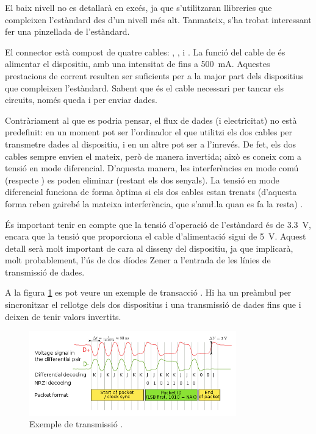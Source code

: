 El baix nivell no es detallarà en excés, ja que s'utilitzaran llibreries que
compleixen l'estàndard des d'un nivell més alt. Tanmateix, s'ha trobat
interessant fer una pinzellada de l'estàndard.

El connector  està compost de quatre cables: , ,
 i . La funció del cable de  és alimentar el
dispositiu, amb una intensitat de fins a
\SI[round-mode=places,round-precision=0]{500}{\milli\ampere}. Aquestes
prestacions de corrent resulten ser suficients per a la major part dels
dispositius que compleixen l'estàndard. Sabent que  és el cable
necessari per tancar els circuits, només queda  i  per
enviar dades.

Contràriament al que es podria pensar, el flux de dades (i electricitat) no
està predefinit: en un moment pot ser l'ordinador el que utilitzi els dos cables
per transmetre dades al dispositiu, i en un altre pot ser a l'inrevés. De fet,
els dos cables sempre envien el mateix, però de manera invertida; això es coneix
com a tensió en mode diferencial. D'aquesta manera, les interferències en mode
comú (respecte
) es poden eliminar (restant els dos senyals). La tensió en mode
diferencial funciona de forma òptima si els dos cables estan trenats (d'aquesta
forma reben gairebé la mateixa interferència, que s'anu\l.la quan es fa la
resta) \cite{DiffTension}.

És important tenir en compte que la tensió d'operació de l'estàndard 
és de
\SI[round-mode=places,round-precision=1]{3.3}{\volt}, encara que la tensió que
proporciona el cable d'alimentació sigui de
\SI[round-mode=places,round-precision=0]{5}{\volt}.
Aquest detall serà molt important de cara
al disseny del dispositiu, ja que implicarà, molt probablement, l'ús de dos
díodes Zener a l'entrada de les línies de transmissió de dades.

A la figura \ref{fig:usb-wave} es pot veure un exemple de transacció .
Hi ha un preàmbul per sincronitzar el rellotge dels dos dispositius i una
transmissió de dades fins que  i  deixen de tenir valors
invertits.

\begin{figure}[ht]
    \centering
    \includegraphics[width=0.8\textwidth]{images/usb_signal_example.png}
    \caption{Exemple de transmissió . \cite{Contributors2024USB}}
    \label{fig:usb-wave}
\end{figure}

